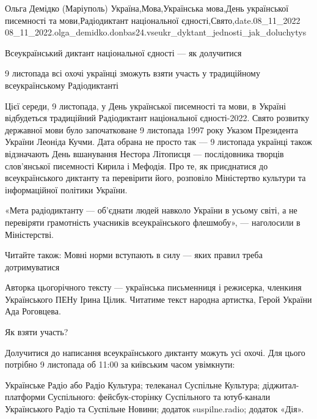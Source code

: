  
 
 
 
 

Ольга Демідко (Маріуполь)
Україна,Мова,Українська мова,День української писемності та мови,Радіодиктант національної єдності,Свято,date.08_11_2022
08_11_2022.olga_demidko.donbas24.vseukr_dyktant_jednosti_jak_doluchytys

Всеукраїнський диктант національної єдності — як долучитися

9 листопада всі охочі українці зможуть взяти участь у традиційному
всеукраїнському Радіодиктанті

Цієї середи, 9 листопада, у День української писемності та мови, в Україні
відбудеться традиційний Радіодиктант національної єдності-2022. Свято розвитку
державної мови було започатковане 9 листопада 1997 року Указом Президента
України Леоніда Кучми. Дата обрана не просто так — 9 листопада українці також
відзначають День вшанування Нестора Літописця — послідовника творців
слов'янської писемності Кирила і Мефодія. Про те, як приєднатися до
всеукраїнського диктанту та перевірити його, розповіло Міністертво культури та
інформаційної політики України.

«Мета радіодиктанту — об'єднати людей навколо України в усьому світі, а не
перевіряти грамотність учасників всеукраїнського флешмобу», — наголосили в
Міністерстві.

Читайте також: Мовні норми вступають в силу — яких правил треба дотримуватися

Авторка цьогорічного тексту — українська письменниця і режисерка, членкиня
Українського ПЕНу Ірина Цілик. Читатиме текст народна артистка, Герой України
Ада Роговцева.

Як взяти участь?

Долучитися до написання всеукраїнського диктанту можуть усі охочі. Для цього потрібно 9 листопада об 11:00 за київським часом увімкнути:

Українське Радіо або Радіо Культура;
телеканал Суспільне Культура;
діджитал-платформи Суспільного: фейсбук-сторінку Суспільного та ютуб-канали Українського Радіо та Суспільне Новини;
додаток suspilne.radio;
додаток «Дія».


